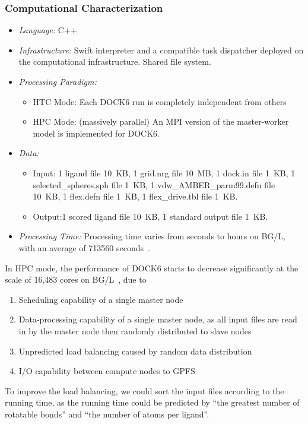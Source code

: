 \documentclass[10pt,letterpaper]{article}
\begin{document}
\subsubsection{Computational Characterization}
\begin {itemize}
\item {\em Language:} C++
\item {\em Infrastructure:} Swift interpreter and a compatible 
        task dispatcher deployed on the computational infrastructure.  
        Shared file system.
\item {\em Processing Paradigm:}
  \begin{itemize}
  \item HTC Mode: Each DOCK6 run is completely independent from others
  \item HPC Mode: (massively parallel) An MPI version of the master-worker model is implemented for DOCK6.
  \end{itemize}

\item {\em Data:}
  \begin{itemize}
  \item Input: 1 ligand file 10~KB, 1 grid.nrg file 10~MB, 1 dock.in file 1~KB,
    1 selected\_spheres.sph file 1~KB, 1 vdw\_AMBER\_parm99.defn file 10~KB,
    1 flex.defn file 1~KB, 1 flex\_drive.tbl file 1~KB.
  \item Output:1 scored ligand file 10~KB, 1 standard output file 1~KB.
  \end{itemize}

\item {\em Processing Time:} Processing time varies from seconds to hours on BG/L, with an average of 713560 seconds~\cite{FALKON-SC-08}.
\end{itemize}

In HPC mode, the performance of DOCK6 starts to decrease significantly at the scale of 16,483 cores on BG/L~\cite{IBM-DOCK-08}, due to
    \begin{enumerate}
    \item Scheduling capability of a single master node
    \item Data-processing capability of a single master node, as all input files are read in by the master node then randomly distributed to slave nodes
    \item Unpredicted load balancing caused by random data distribution
    \item I/O capability between compute nodes to GPFS
    \end{enumerate}
To improve the load balancing, we could sort the input files according to the running time, as the running time could be predicted by ``the greatest number of rotatable bonds'' and ``the number of atoms per ligand''.
    
\end{document}
